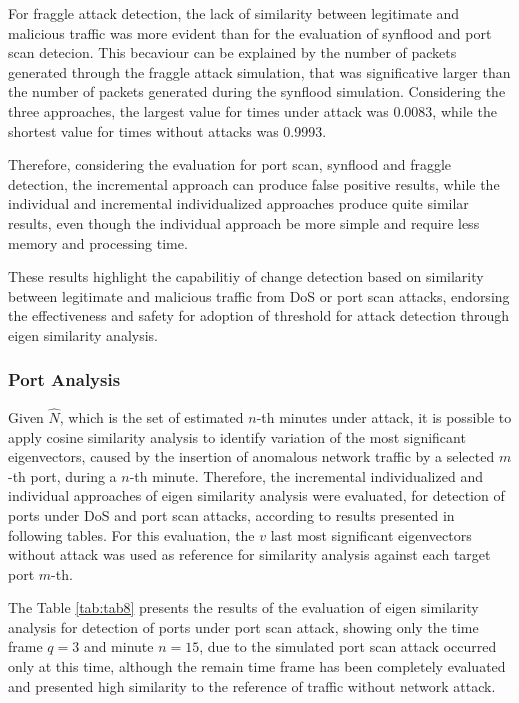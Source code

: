 \documentclass{bmcart}
\begin{document}
For fraggle attack detection, the lack of similarity between legitimate and malicious traffic was more evident than for the evaluation of synflood and port scan detecion. This becaviour can be explained by the number of packets generated through the fraggle attack simulation, that was significative larger than the number of packets generated during the synflood simulation. Considering the three approaches, the largest value for times under attack was 0.0083, while the shortest value for times without attacks was 0.9993. 

Therefore, considering the evaluation for port scan, synflood and fraggle detection, the incremental approach can produce false positive results, while the individual and incremental individualized approaches produce quite similar results, even though the individual approach be more simple and require less memory and processing time.

These results highlight the capabilitiy of change detection based on similarity between legitimate and malicious traffic from DoS or port scan attacks, endorsing the effectiveness and safety for adoption of threshold for attack detection through eigen similarity analysis.

\subsubsection{Port Analysis}
\label{sec:PortAnalysis}

Given $\hat{N}$, which is the set of estimated $n$-th minutes under attack, it is possible to apply cosine similarity analysis to identify variation of the most significant eigenvectors, caused by the insertion of anomalous network traffic by a selected $m$-th port, during a $n$-th minute. Therefore, the incremental individualized and individual approaches of eigen similarity analysis were evaluated, for detection of ports under DoS and port scan attacks, according to results presented in following tables. For this evaluation, the $v$ last most significant eigenvectors without attack was used as reference for similarity analysis against each target port $m$-th.

The Table \ref{tab:tab8} presents the results of the evaluation of eigen similarity analysis for detection of ports under port scan attack, showing only the time frame $q=3$ and minute $n=15$, due to the simulated port scan attack occurred only at this time, although the remain time frame has been completely evaluated and presented high similarity to the reference of traffic without network attack.
\end{document}
